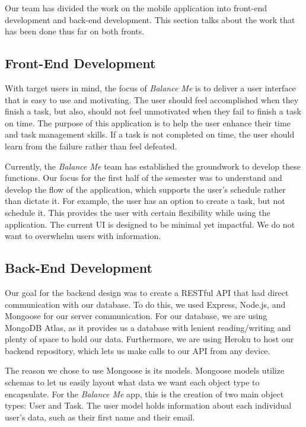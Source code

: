 \documentclass{sigchi}
\begin{document}
Our team has divided the work on the mobile application into front-end
development and back-end development. This section talks about the work that
has been done thus far on both fronts.

\subsection{Front-End Development}

With target users in mind, the focus of \textit{Balance Me} is to deliver a
user interface that is easy to use and motivating. The user should feel
accomplished when they finish a task, but also, should not feel unmotivated
when they fail to finish a task on time. The purpose of this application is to
help the user enhance their time and task management skills. If a task is not
completed on time, the user should learn from the failure rather than feel
defeated.

Currently, the \textit{Balance Me} team has established the groundwork to
develop these functions. Our focus for the first half of the semester was to
understand and develop the flow of the application, which supports the user’s
schedule rather than dictate it. For example, the user has an option to create a
task, but not schedule it. This provides the user with certain flexibility
while using the application. The current UI is designed to be minimal yet
impactful. We do not want to overwhelm users with information.


\subsection{Back-End Development}

Our goal for the backend design was to create a RESTful API that had direct
communication with our database. To do this, we used Express, Node.js, and
Mongoose for our server communication. For our database, we are using MongoDB
Atlas, as it provides us a database with lenient reading/writing and plenty of
space to hold our data. Furthermore, we are using Heroku to host our backend
repository, which lets us make calls to our API from any device.

The reason we chose to use Mongoose is its models. Mongoose models utilize
schemas to let us easily layout what data we want each object type to
encapsulate. For the \textit{Balance Me} app, this is the creation of two main
object types: User and Task. The user model holds information about each
individual user’s data, such as their first name and their email.
\end{document}
